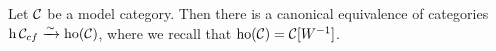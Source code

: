 \begin{theorem}
	Let \(\mathcal{C}\) be a model category. Then there is a canonical equivalence of categories \(\operatorname{h}{\mathcal{C}_{cf}} \xrightarrow{\sim} \operatorname{ho}(\mathcal{C})\), where we recall that \(\operatorname{ho}(\mathcal{C}) = \mathcal{C}[W^{-1}]\).
\end{theorem}





